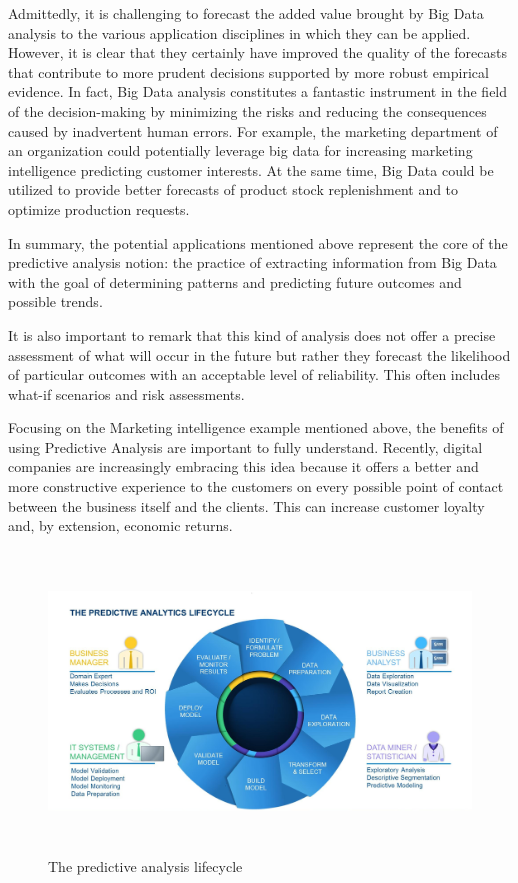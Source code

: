 Admittedly, it is challenging to forecast the added value brought by Big Data analysis to the various application disciplines in which they can be applied. However, it is clear that they certainly have improved the quality of the forecasts that contribute to more prudent decisions supported by more robust empirical evidence. 
In fact, Big Data analysis constitutes a fantastic instrument in the field of the decision-making by minimizing the risks and reducing the consequences caused by inadvertent human errors. For example, the marketing department of an organization could potentially leverage big data for increasing marketing intelligence predicting customer interests. At the same time, Big Data could be utilized to provide better forecasts of product stock replenishment and to optimize production requests.

In summary, the potential applications mentioned above represent the core of the predictive analysis notion: the practice of extracting information from Big Data with the goal of determining patterns and predicting future outcomes and possible trends. 

It is also important to remark that this kind of analysis does not offer a precise assessment of what will occur in the future but rather they forecast the likelihood of particular outcomes with an acceptable level of reliability. This often includes what-if scenarios and risk assessments.

Focusing on the Marketing intelligence example mentioned above, the benefits of using Predictive Analysis are important to fully understand. Recently, digital companies are increasingly embracing this idea because it offers a better and more constructive experience to the customers on every possible point of contact between the business itself and the clients. This can increase customer loyalty and, by extension, economic returns.

\vspace{0.5cm}
\begin{figure}[htbp]
  \centering
    \includegraphics[height=8cm]{images/pa-lifecycle.jpg}
  \caption{The predictive analysis lifecycle }
  \label{fig:bigdata}
\end{figure}
\vspace{0.5cm}


